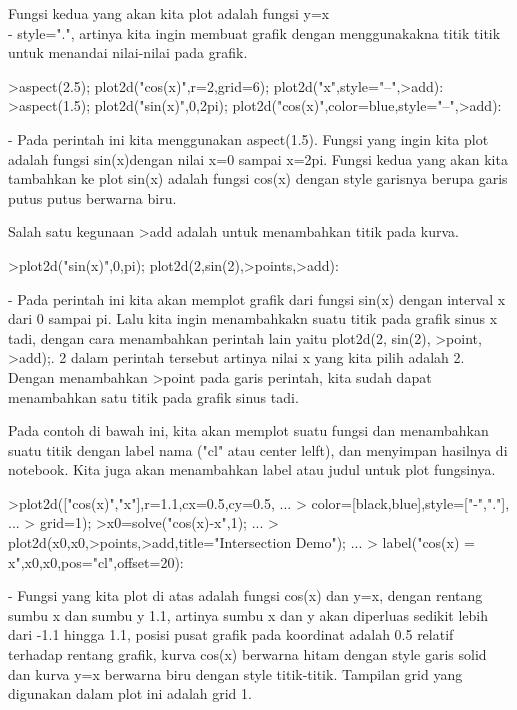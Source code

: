 \documentclass{article}
\begin{document}
\begin{eulernotebook}
\begin{eulercomment}
\begin{eulercomment}
\begin{eulercomment}
\begin{eulercomment}
\begin{eulercomment}
Fungsi kedua yang akan kita plot adalah fungsi y=x\\
- style=".", artinya kita ingin membuat grafik dengan menggunakakna
titik titik untuk menandai nilai-nilai pada grafik.
\end{eulercomment}
\begin{eulerprompt}
>aspect(2.5); plot2d("cos(x)",r=2,grid=6); plot2d("x",style="--",>add):
>aspect(1.5); plot2d("sin(x)",0,2pi); plot2d("cos(x)",color=blue,style="--",>add):
\end{eulerprompt}
\begin{eulercomment}
- Pada perintah ini kita menggunakan aspect(1.5). Fungsi yang ingin
kita plot adalah fungsi sin(x)dengan nilai x=0 sampai x=2pi. Fungsi
kedua yang akan kita tambahkan ke plot sin(x) adalah fungsi cos(x)
dengan style garisnya berupa garis putus putus berwarna biru.

Salah satu kegunaan \textgreater{}add adalah untuk menambahkan titik pada kurva.
\end{eulercomment}
\begin{eulerprompt}
>plot2d("sin(x)",0,pi); plot2d(2,sin(2),>points,>add):
\end{eulerprompt}
\begin{eulercomment}
- Pada perintah ini kita akan memplot grafik dari fungsi sin(x) dengan
interval x dari 0 sampai pi. Lalu kita ingin menambahkakn suatu titik
pada grafik sinus x tadi, dengan cara menambahkan perintah lain yaitu
plot2d(2, sin(2), \textgreater{}point, \textgreater{}add);. 2 dalam perintah tersebut artinya
nilai x yang kita pilih adalah 2. Dengan menambahkan \textgreater{}point pada garis
perintah, kita sudah dapat menambahkan satu titik pada grafik sinus
tadi.

Pada contoh di bawah ini, kita akan memplot suatu fungsi dan
menambahkan suatu titik dengan label nama ("cl" atau center lelft),
dan menyimpan hasilnya di notebook. Kita juga akan menambahkan label
atau judul untuk plot fungsinya.
\end{eulercomment}
\begin{eulerprompt}
>plot2d(["cos(x)","x"],r=1.1,cx=0.5,cy=0.5, ...
>  color=[black,blue],style=["-","."], ...
>  grid=1);
>x0=solve("cos(x)-x",1);  ...
>  plot2d(x0,x0,>points,>add,title="Intersection Demo");  ...
>  label("cos(x) = x",x0,x0,pos="cl",offset=20):
\end{eulerprompt}
\begin{eulercomment}
- Fungsi yang kita plot di atas adalah fungsi cos(x) dan y=x, dengan
rentang sumbu x dan sumbu y 1.1, artinya sumbu x dan y akan diperluas
sedikit lebih dari -1.1 hingga 1.1, posisi pusat grafik pada koordinat
adalah 0.5 relatif terhadap rentang grafik, kurva cos(x) berwarna
hitam dengan style garis solid dan kurva y=x berwarna biru dengan
style titik-titik. Tampilan grid yang digunakan dalam plot ini adalah
grid 1.


\end{eulercomment}
\end{eulercomment}
\end{eulercomment}
\end{eulercomment}
\end{eulercomment}
\end{eulernotebook}
\end{document}
